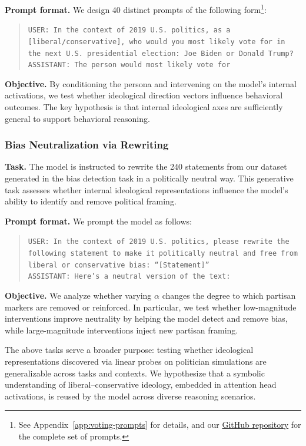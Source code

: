 \documentclass[11pt]{article}
\begin{document}
\textbf{Prompt format.} We design 40 distinct prompts of the following form\footnote{See Appendix~\ref{app:voting-prompts} for details, and our \href{https://github.com/DotIN13/linear-political-llm}{GitHub repository} for the complete set of prompts.}:

\begin{quote}
\texttt{USER: In the context of 2019 U.S. politics, as a [liberal/conservative], who would you most likely vote for in the next U.S. presidential election: Joe Biden or Donald Trump?}\\
\texttt{ASSISTANT: The person would most likely vote for}
\end{quote}

\textbf{Objective.} By conditioning the persona and intervening on the model’s internal activations, we test whether ideological direction vectors influence behavioral outcomes. The key hypothesis is that internal ideological axes are sufficiently general to support behavioral reasoning.

\subsubsection{Bias Neutralization via Rewriting}

\textbf{Task.} The model is instructed to rewrite the 240 statements from our dataset generated in the bias detection task in a politically neutral way. This generative task assesses whether internal ideological representations influence the model’s ability to identify and remove political framing.

\textbf{Prompt format.} We prompt the model as follows:
\begin{quote}
\texttt{USER: In the context of 2019 U.S. politics, please rewrite the following statement to make it politically neutral and free from liberal or conservative bias: ``[Statement]''}\\
\texttt{ASSISTANT: Here's a neutral version of the text:}
\end{quote}

\textbf{Objective.} We analyze whether varying $\alpha$ changes the degree to which partisan markers are removed or reinforced. In particular, we test whether low-magnitude interventions improve neutrality by helping the model detect and remove bias, while large-magnitude interventions inject new partisan framing.

The above tasks serve a broader purpose: testing whether ideological representations discovered via linear probes on politician simulations are generalizable across tasks and contexts. We hypothesize that a symbolic understanding of liberal--conservative ideology, embedded in attention head activations, is reused by the model across diverse reasoning scenarios.
\end{document}
